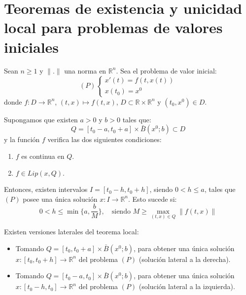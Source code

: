 \chapter{Teoremas de existencia y unicidad local para problemas de valores iniciales}
\begin{theorem}
    Sean $n \geq 1$ y $\|.\|$ una norma en $\mathbb{R}^n$.
    Sea el problema de valor inicial:
    $$(P) \begin{cases}
            x'(t) = f(t, x(t)) \\
            x(t_0) = x^0
        \end{cases}$$
    donde $f: D \to \mathbb{R}^n$, $(t, x) \mapsto f(t, x)$, $D \subset \mathbb{R} \times \mathbb{R}^n$ y $(t_0, x^0) \in D$.

    Supongamos que existen $a > 0$ y $b > 0$ tales que:
    $$Q = [t_0 - a, t_0 + a] \times \bar{B}(x^0; b) \subset D$$
    y la función $f$ verifica las dos siguientes condiciones:
    \begin{enumerate}
        \item $f$ es continua en $Q$.
        \item $f \in Lip(x, Q)$.
    \end{enumerate}
    Entonces, existen intervalos $I = [t_0 - h, t_0 + h]$, siendo $0 < h \leq a$, tales que $(P)$ posee una única solución $x: I \to \mathbb{R}^n$.
    Esto sucede si:
    $$0 < h \leq \min\{a, \frac{b}{M}\}, \quad \text{siendo } M \geq \max_{(t, x) \in Q} \|f(t, x)\|$$
\end{theorem}

\begin{remark}
    Existen versiones laterales del teorema local:
    \begin{itemize}
        \item Tomando $Q = [t_0, t_0 + a] \times \bar{B}(x^0; b)$, para obtener una única solución $x: [t_0, t_0 + h] \to \mathbb{R}^n$ del problema $(P)$ (solución lateral a la derecha).
        \item Tomando $Q = [t_0 - a, t_0] \times \bar{B}(x^0; b)$, para obtener una única solución $x: [t_0 - h, t_0] \to \mathbb{R}^n$ del problema $(P)$ (solución lateral a la izquierda).
    \end{itemize}
\end{remark}

